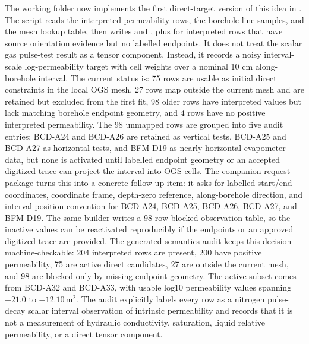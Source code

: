 The working folder now implements the first direct-target version of this idea in
.  The
script reads the interpreted permeability rows, the borehole line samples, and the
mesh lookup table, then writes  and
, plus
 for interpreted rows that have source
orientation evidence but no labelled endpoints.  It does not treat the scalar gas
pulse-test result as a tensor component.  Instead, it records a noisy interval-scale
log-permeability target with cell weights over a nominal 10 cm along-borehole
interval.  The current status is: 75 rows are usable as initial direct constraints in
the local OGS mesh, 27 rows map outside the current mesh and are retained but excluded
from the first fit, 98 older rows have interpreted values but lack matching borehole
endpoint geometry, and 4 rows have no positive interpreted permeability.  The 98
unmapped rows are grouped into five audit entries: BCD-A24 and BCD-A26 are retained
as vertical tests, BCD-A25 and BCD-A27 as horizontal tests, and BFM-D19 as nearly
horizontal evapometer data, but none is activated until labelled endpoint geometry or
an accepted digitized trace can project the interval into OGS cells.  The companion
request package
turns this into a concrete follow-up item: it asks for labelled start/end
coordinates, coordinate frame, depth-zero reference, along-borehole direction, and
interval-position convention for BCD-A24, BCD-A25, BCD-A26, BCD-A27, and BFM-D19.
The same builder writes a 98-row blocked-observation table, so the inactive values
can be reactivated reproducibly if the endpoints or an approved digitized trace are
provided.
The generated semantics audit
keeps this decision machine-checkable: 204 interpreted rows are present, 200 have
positive permeability, 75 are active direct candidates, 27 are outside the current
mesh, and 98 are blocked only by missing endpoint geometry.  The active subset comes
from BCD-A32 and BCD-A33, with usable log10 permeability values spanning
\(-21.0\) to \(-12.10\)\,\(\mathrm{m^2}\).  The audit explicitly labels every row as
a nitrogen pulse-decay scalar interval observation of intrinsic permeability and
records that it is not a measurement of hydraulic conductivity, saturation, liquid
relative permeability, or a direct tensor component.

